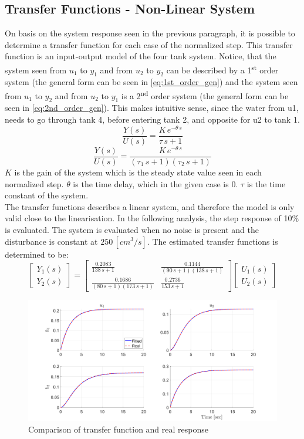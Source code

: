 \subsection{Transfer Functions - Non-Linear System}
\label{sec:TF_non-lin}
On basis on the system response seen in the previous paragraph, it is possible to determine a transfer function for each case of the normalized step. This transfer function is an input-output model of the four tank system. Notice, that the system seen from $u_1$ to $y_1$ and from $u_2$ to $y_2$ can be described by a 1\textsuperscript{st} order system (the general form can be seen in \cref{eq:1st_order_gen}) and the system seen from $u_1$ to $y_2$ and from $u_2$ to $y_1$ is a 2\textsuperscript{nd} order system (the general form can be seen in \cref{eq:2nd_order_gen}). This makes intuitive sense, since the water from u1, needs to go through tank 4, before entering tank 2, and opposite for u2 to tank 1.
\begin{equation}
    \frac{Y(s)}{U(s)}=\frac{K\,e^{-\theta\,s}}{\tau\,s+1}
    \label{eq:1st_order_gen}
\end{equation}
\begin{equation}
    \frac{Y(s)}{U(s)}=\frac{K\,e^{-\theta\,s}}{(\tau_1\,s+1)(\tau_2\,s+1)}
    \label{eq:2nd_order_gen}
\end{equation}
$K$ is the gain of the system which is the steady state value seen in each normalized step. $\theta$ is the time delay, which in the given case is 0. $\tau$ is the time constant of the system. \\
The transfer functions describes a linear system, and therefore the model is only valid close to the linearisation. In the following analysis, the step response of 10\% is evaluated. The system is evaluated when no noise is present and the disturbance is constant at $250\,[cm^3/s]$. The estimated transfer functions is determined to be:
\begin{equation}
    \begin{bmatrix}
        Y_1(s)\\
        Y_2(s)
    \end{bmatrix}
    =
    \begin{bmatrix}
        \frac{0.2083}{138\,s+1} & \frac{0.1144}{(90\,s+1)(138\,s+1)}\\ 
        \frac{0.1686}{(80\,s+1)(173\,s+1)} & \frac{0.2736}{153\,s+1} 
    \end{bmatrix}
    \begin{bmatrix}
        U_1(s)\\
        U_2(s)
    \end{bmatrix}
\end{equation}
\begin{figure}[H]
    \centering
    \includegraphics[width=1\textwidth]{Figures/Pr3.4_TF_fit.png}
    \caption{Comparison of transfer function and real response}
\end{figure}
